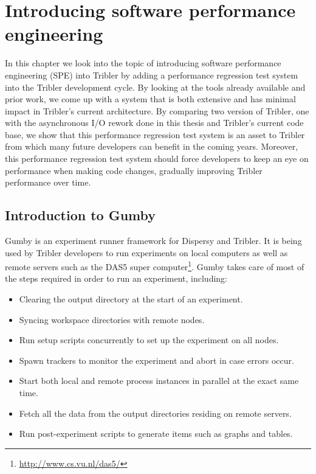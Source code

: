 \chapter{Introducing software performance engineering}
\label{cpt:software_performance_engineering}

In this chapter we look into the topic of introducing software performance engineering (SPE) into Tribler by adding a performance regression test system into the Tribler development cycle.
By looking at the tools already available and prior work, we come up with a system that is both extensive and has minimal impact in Tribler's current architecture.
By comparing two version of Tribler, one with the asynchronous I/O rework done in this thesis and Tribler's current code base, we show that this performance regression test system is an asset to Tribler from which many future developers can benefit in the coming years.
Moreover, this performance regression test system should force developers to keep an eye on performance when making code changes, gradually improving Tribler performance over time.

\section{Introduction to Gumby}
\label{sct:gumby_introduction}

Gumby is an experiment runner framework for Dispersy and Tribler.
It is being used by Tribler developers to run experiments on local computers as well as remote servers such as the DAS5 super computer\footnote{\url{http://www.cs.vu.nl/das5/}}.
Gumby takes care of most of the steps required in order to run an experiment, including:

\begin{itemize}
	\item Clearing the output directory at the start of an experiment.
	\item Syncing workspace directories with remote nodes.
	\item Run setup scripts concurrently to set up the experiment on all nodes.
	\item Spawn trackers to monitor the experiment and abort in case errors occur.
	\item Start both local and remote process instances in parallel at the exact same time.
	\item Fetch all the data from the output directories residing on remote servers.
	\item Run post-experiment scripts to generate items such as graphs and tables.
\end{itemize}

